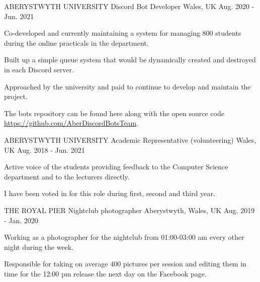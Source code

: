 \begin{cventries}
  \cventry
    {ABERYSTWYTH UNIVERSITY} %
    {Discord Bot Developer} %
    {Wales, UK} %
    {Aug. 2020 - Jun. 2021} %
    {
      \begin{cvitems} %
        \item {Co-developed and currently maintaining a system for managing 800 students during the online practicals in the department.}
        \item {Built up a simple queue system that would be dynamically created and destroyed in each Discord server.}
        \item {Approached by the university and paid to continue to develop and maintain the project.}
        \item {The bots repository can be found here along with the open source code \url{https://github.com/AberDiscordBotsTeam}.}
      \end{cvitems}
    }

  \cventry
    {ABERYSTWYTH UNIVERSITY} %
    {Academic Representative (volunteering)} %
    {Wales, UK} %
    {Aug. 2018 - Jun. 2021} %
    {
      \begin{cvitems} %
        \item {Active voice of the students providing feedback to the Computer Science department and to the lecturers directly.}
        \item {I have been voted in for this role during first, second and third year.}
      \end{cvitems}
    }
    
  \cventry
    {THE ROYAL PIER} %
    {Nightclub photographer} %
    {Aberystwyth, Wales, UK} %
    {Aug. 2019 - Jan. 2020} %
    {
      \begin{cvitems} %
        \item {Working as a photographer for the nightclub from 01:00-03:00 am every other night during the week.}
        \item {Responsible for taking on average 400 pictures per session and editing them in time for the 12:00 pm release the next day on the Facebook page.}
      \end{cvitems}
    }
    

\end{cventries}
